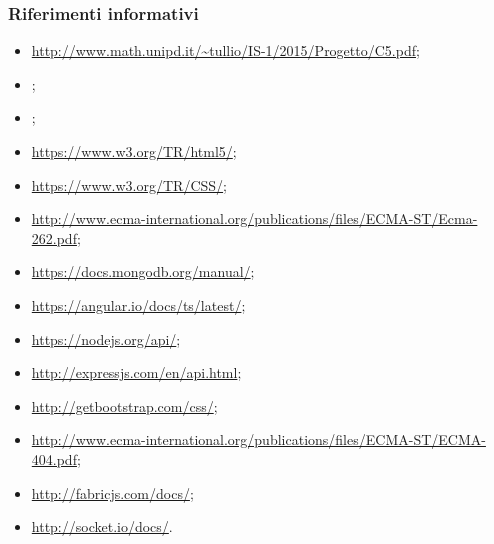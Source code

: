 \documentclass[a4paper, titlepage]{article}
\begin{document}
\subsubsection{Riferimenti informativi}
\begin{itemize}
\item {}  \newline \url{http://www.math.unipd.it/~tullio/IS-1/2015/Progetto/C5.pdf};

\item {} \Gldoc;

\item {} \AdRdoc;

\item {} \newline \url{https://www.w3.org/TR/html5/};

\item {} \newline \url{https://www.w3.org/TR/CSS/};

\item {} \newline \url{http://www.ecma-international.org/publications/files/ECMA-ST/Ecma-262.pdf};

\item {} \newline \url{https://docs.mongodb.org/manual/};

\item {} \newline \url{https://angular.io/docs/ts/latest/};

\item {} \newline \url{https://nodejs.org/api/};

\item {} \newline \url{http://expressjs.com/en/api.html};

\item {} \newline \url{http://getbootstrap.com/css/};

\item {} \newline \url{http://www.ecma-international.org/publications/files/ECMA-ST/ECMA-404.pdf};

\item {} \newline \url{http://fabricjs.com/docs/};

\item {} \newline \url{http://socket.io/docs/}.

\end{itemize}
\end{document}
